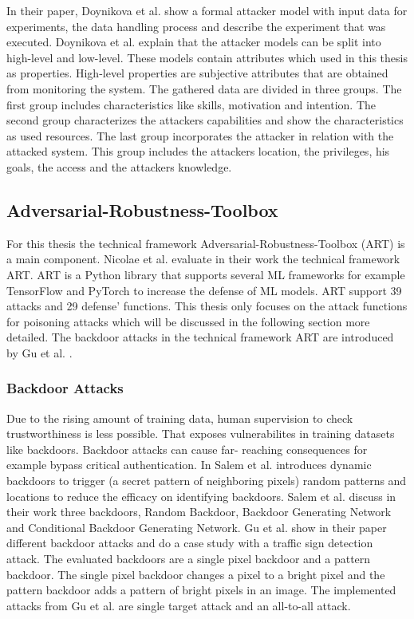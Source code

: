 In their paper, Doynikova et al. \cite{DBLP:conf/crisis/DoynikovaNGK20} show a formal attacker model with input data for experiments, the data handling process and describe the experiment that was executed. Doynikova et al. explain that the attacker models can be split into high-level and low-level. These models contain attributes which used in this thesis as properties. High-level properties are subjective attributes that are obtained from monitoring the system. The gathered data are divided in three groups. The first group includes characteristics like skills, motivation and intention. The second group characterizes the attackers capabilities and show the characteristics as used resources. The last group incorporates the attacker in relation with the attacked system. This group includes the attackers location, the privileges, his goals, the access and the attackers knowledge.

\subsection{Adversarial-Robustness-Toolbox}

For this thesis the technical framework Adversarial-Robustness-Toolbox (ART) \cite{art2018} is a main component. Nicolae et al. \cite{DBLP:journals/corr/abs-1807-01069} evaluate in their work the
technical framework ART. ART is a Python library that supports several ML frameworks for example TensorFlow and PyTorch to increase the defense of ML models. ART support 39 attacks and 29 defense'
functions. This thesis only focuses on the attack functions for poisoning attacks which will be discussed in the following section more detailed. The backdoor attacks in the technical framework
ART are introduced by Gu et al. \cite{DBLP:journals/corr/abs-1708-06733}.

\subsubsection*{Backdoor Attacks}
\label{sec:backdoor}
Due to the rising amount of training data, human supervision to check trustworthiness is less possible. That exposes vulnerabilites in training datasets like backdoors. Backdoor attacks can cause far-
reaching consequences for example bypass critical authentication. In \cite{DBLP:journals/corr/abs-2003-03675} Salem et al. introduces dynamic backdoors to trigger (a secret pattern of neighboring
pixels) random patterns and locations to reduce the efficacy on identifying backdoors. Salem et al. discuss in their work three backdoors, Random Backdoor, Backdoor Generating Network and Conditional
Backdoor Generating Network.
Gu et al. show in their paper different backdoor attacks and do a case study with a traffic sign detection attack. The evaluated backdoors are a single pixel backdoor and a pattern backdoor. The single
pixel backdoor changes a pixel to a bright pixel and the pattern backdoor adds a pattern of bright pixels in an image. The implemented attacks from Gu et al. are single target attack and an all-to-all attack.

